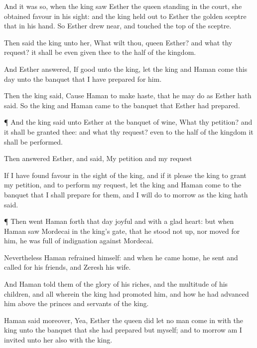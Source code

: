 {And it was so, when the
king
saw
Esther the
queen
standing in the
court,
{} she
obtained
favour in his
sight: and the
king held
out to
Esther the
golden
sceptre that
{} in his
hand. So
Esther drew
near, and
touched the
top of the
sceptre.

Then
said the
king unto her, What wilt thou,
queen
Esther? and what
{} thy
request? it shall be even
given thee to the
half of the
kingdom.

And
Esther
answered, If
{}
good unto the
king, let the
king and
Haman
come this
day unto the
banquet that I have
prepared for him.

Then the
king
said, Cause
Haman to make
haste, that he may
do as
Esther hath
said. So the
king and
Haman
came to the
banquet that
Esther had
prepared.


\par }{\PP {}¶ And the
king
said unto
Esther at the
banquet of
wine, What
{} thy
petition? and it shall be
granted thee: and what
{} thy
request? even to the
half of the
kingdom it shall be
performed.

Then
answered
Esther, and
said, My
petition and my
request
{}

If I have
found
favour in the
sight of the
king, and if it
please the
king to
grant my
petition, and to
perform my
request, let the
king and
Haman
come to the
banquet that I shall
prepare for them, and I will
do to
morrow as the
king hath
said.


\par }{\PP {}¶ Then
went
Haman
forth that
day
joyful and with a
glad
heart: but when
Haman
saw
Mordecai in the
king’s
gate, that he stood not
up, nor
moved for him,
he was
full of
indignation against
Mordecai.

Nevertheless
Haman
refrained himself: and when he
came
home, he
sent and
called for his
friends, and
Zeresh his
wife.

And
Haman
told them of the
glory of his
riches, and the
multitude of his
children, and all
{} wherein the
king had
promoted him, and how he had
advanced him above the
princes and
servants of the
king.

Haman
said moreover, Yea,
Esther the
queen did let no man come
in with the
king unto the
banquet that she had
prepared but myself; and to
morrow am I
invited unto her also with the
king.

}
